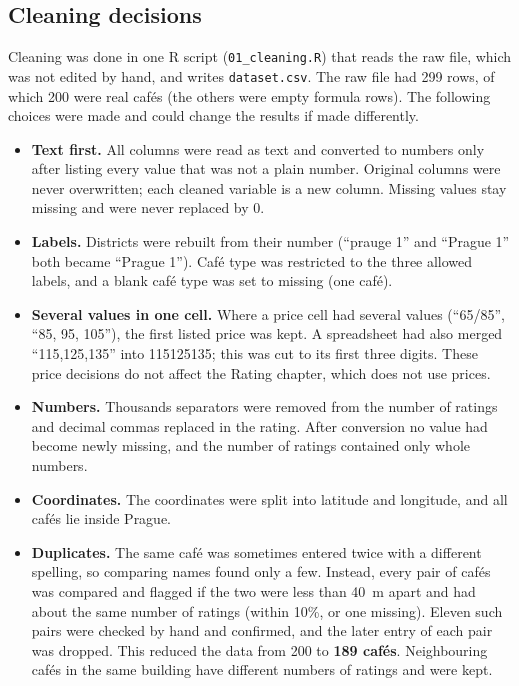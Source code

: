 \documentclass[11pt,a4paper]{article}
\begin{document}
\subsection{Cleaning decisions}
Cleaning was done in one R script (\texttt{01\_cleaning.R}) that reads the raw file, which was not edited by hand, and writes \texttt{dataset.csv}. The raw file had 299 rows, of which 200 were real caf\'es (the others were empty formula rows). The following choices were made and could change the results if made differently.
\begin{itemize}
  \item \textbf{Text first.} All columns were read as text and converted to numbers only after listing every value that was not a plain number. Original columns were never overwritten; each cleaned variable is a new column. Missing values stay missing and were never replaced by 0.
  \item \textbf{Labels.} Districts were rebuilt from their number (``prauge 1'' and ``Prague 1'' both became ``Prague 1''). Caf\'e type was restricted to the three allowed labels, and a blank caf\'e type was set to missing (one caf\'e).
  \item \textbf{Several values in one cell.} Where a price cell had several values (``65/85'', ``85, 95, 105''), the first listed price was kept. A spreadsheet had also merged ``115,125,135'' into 115125135; this was cut to its first three digits. These price decisions do not affect the Rating chapter, which does not use prices.
  \item \textbf{Numbers.} Thousands separators were removed from the number of ratings and decimal commas replaced in the rating. After conversion no value had become newly missing, and the number of ratings contained only whole numbers.
  \item \textbf{Coordinates.} The coordinates were split into latitude and longitude, and all caf\'es lie inside Prague.
  \item \textbf{Duplicates.} The same caf\'e was sometimes entered twice with a different spelling, so comparing names found only a few. Instead, every pair of caf\'es was compared and flagged if the two were less than 40~m apart and had about the same number of ratings (within 10\%, or one missing). Eleven such pairs were checked by hand and confirmed, and the later entry of each pair was dropped. This reduced the data from 200 to \textbf{189 caf\'es}. Neighbouring caf\'es in the same building have different numbers of ratings and were kept.
\end{itemize}
\end{document}
